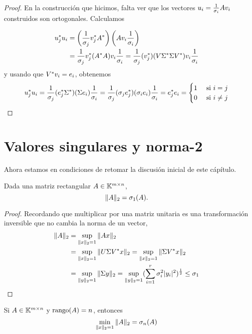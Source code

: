 \begin{proof}
En la construcción que hicimos, falta ver que los vectores $\ub_i = \frac{1}{\sigma_i} \Ab \vb_i$ construidos son ortogonales. Calculamos

$$
\begin{aligned}
\ub_j^* \ub_i &= \left(\frac{1}{\sigma_j} \vb_j^* \Ab^* \right) \left(\Ab \vb_i  \frac{1}{\sigma_i}\right) \\
&= \frac{1}{\sigma_j} \vb_j^* ( \Ab^* \Ab) \vb_i  \frac{1}{\sigma_i} = \frac{1}{\sigma_j} (\vb_j^*) ( \Vb \Sigmab^* \Sigmab \Vb^*) \vb_i  \frac{1}{\sigma_i}
\end{aligned}
$$
y usando que $\Vb^* \vb_i = \eb_i$, obtenemos
$$
\ub_j^* \ub_i = \frac{1}{\sigma_j} (\eb_j^* \Sigmab^*) (\Sigmab \eb_i)  \frac{1}{\sigma_i}
 = \frac{1}{\sigma_j} (\sigma_j \eb_j^*) ( \sigma_i \eb_i)  \frac{1}{\sigma_i} = \eb_j^* \eb_i
 = \begin{cases} 1 & \text{ si } i = j \\
 0 & \text{ si } i \neq j
 \end{cases}
$$
\end{proof}

\section{Valores singulares y norma-2}

Ahora estamos en condiciones de retomar la discusión inicial de este cápítulo.

\begin{teo}
Dada una matriz rectangular $\Ab \in \K^{m \times n}$,
$$
\|\Ab\|_2 = \sigma_1(\Ab).
$$
\end{teo}

\begin{proof}
 Recordando que multiplicar por una matriz unitaria es una transformación inversible que no cambia la norma de un vector,
$$
\begin{aligned}
\|\Ab\|_2 &= \sup_{\|\xb\|_2 = 1} \|\Ab\xb\|_2 \\
& = \sup_{\|\xb\|_2 = 1} \|\Ub \Sigmab \Vb^* \xb\|_2 = \sup_{\|\xb\|_2 = 1} \|\Sigmab \Vb^* \xb\|_2 \\
&= \sup_{\|\yb\|_2 = 1} \|\Sigmab \yb \|_2  = \sup_{\|\yb\|_2 = 1} (\sum_{i=1}^r \sigma_i^2 |y_i|^2)^{\frac12} \le \sigma_1
\end{aligned}
$$
\end{proof}

\begin{proposicion} Si $\Ab \in \K^{m \times n}$ y $\rank(\Ab) = n$, entonces
$$
\min_{\|x\|_2=1} \|\Ab\|_2 = \sigma_n(\Ab)
$$
\end{proposicion}

